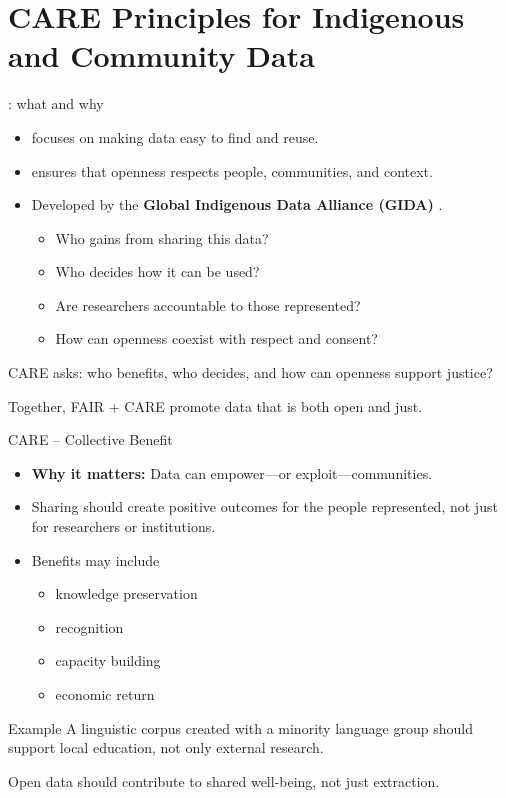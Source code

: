 \documentclass[aspectratio=169]{beamer}
\begin{document}
\section{CARE Principles for Indigenous and Community Data}

\begin{frame}{: what and why}
\begin{itemize}
  \item {} focuses on making data easy to find and reuse.  
  \item {} ensures that openness respects people, communities, and context.  
  \item Developed by the \textbf{Global Indigenous Data Alliance (GIDA)}
    \citep{CARE2020}.
\begin{itemize}
  \item {} Who gains from sharing this data?  
  \item {} Who decides how it can be used?  
  \item {} Are researchers accountable to those represented?  
  \item {} How can openness coexist with respect and consent?
\end{itemize}\end{itemize}
\medskip
CARE asks: who benefits, who decides, and how can openness support justice?

\medskip
Together, FAIR + CARE promote data that is both open and just.
\end{frame}

\begin{frame}{CARE – Collective Benefit}
\begin{itemize}
  \item \textbf{Why it matters:} Data can empower—or exploit—communities.  
  \item Sharing should create positive outcomes for the people represented, not just for researchers or institutions.  
  \item Benefits may include
    \begin{itemize}
    \item knowledge preservation
    \item recognition
    \item capacity building
    \item economic return
    \end{itemize}
  \end{itemize}
\begin{exampleblock}{Example}
A linguistic corpus created with a minority language group should support local education, not only external research.
\end{exampleblock}
Open data should contribute to shared well-being, not just extraction.
\end{frame}
\end{document}
